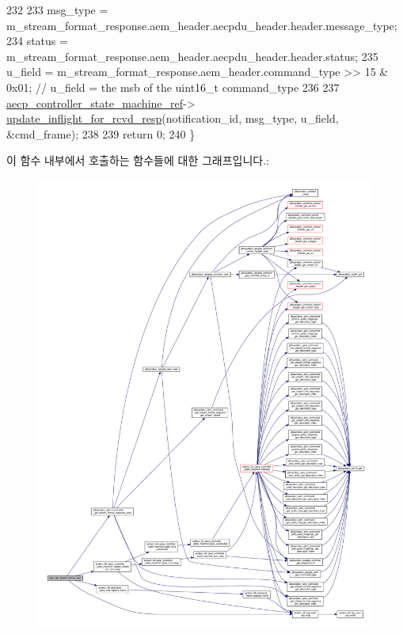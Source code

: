 \begin{DoxyCode}
232 
233     msg\_type = m\_stream\_format\_response.aem\_header.aecpdu\_header.header.message\_type;
234     status = m\_stream\_format\_response.aem\_header.aecpdu\_header.header.status;
235     u\_field = m\_stream\_format\_response.aem\_header.command\_type >> 15 & 0x01; \textcolor{comment}{// u\_field = the msb of the
       uint16\_t command\_type}
236 
237     \hyperlink{namespaceavdecc__lib_a0b1b5aea3c0490f77cbfd9178af5be22}{aecp\_controller\_state\_machine\_ref}->
      \hyperlink{classavdecc__lib_1_1aecp__controller__state__machine_a997abd9786c330a5505e903e6443208e}{update\_inflight\_for\_rcvd\_resp}(notification\_id, msg\_type, u\_field, &cmd\_frame);
238 
239     \textcolor{keywordflow}{return} 0;
240 \}
\end{DoxyCode}


이 함수 내부에서 호출하는 함수들에 대한 그래프입니다.\+:
\nopagebreak
\begin{figure}[H]
\begin{center}
\leavevmode
\includegraphics[width=350pt]{classavdecc__lib_1_1stream__input__descriptor__imp_a14f4051747c7470766410b64a8dfef84_cgraph}
\end{center}
\end{figure}




